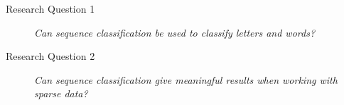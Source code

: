 
\begin{description}
    \item[Research Question 1]{\textit{Can sequence classification be used to classify letters and words?}}
    \item[Research Question 2]{\textit{Can sequence classification give meaningful results when working with sparse data?}}
\end{description}